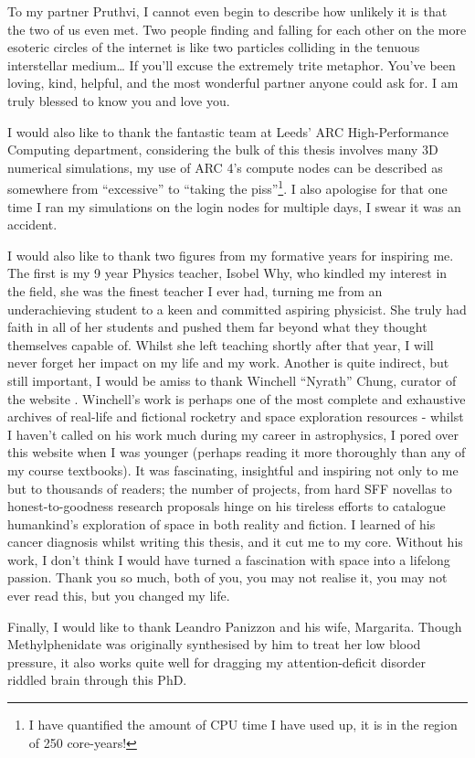 \begin{acknowledgements}
To my partner Pruthvi, I cannot even begin to describe how unlikely it is that the two of us even met.
Two people finding and falling for each other on the more esoteric circles of the internet is like two particles colliding in the tenuous interstellar medium\ldots{}
If you'll excuse the extremely trite metaphor.
You've been loving, kind, helpful, and the most wonderful partner anyone could ask for.
I am truly blessed to know you and love you.

I would also like to thank the fantastic team at Leeds' ARC High-Performance Computing department, considering the bulk of this thesis involves many 3D numerical simulations, my use of ARC 4's compute nodes can be described as somewhere from ``excessive'' to ``taking the piss''\footnote{I have quantified the amount of CPU time I have used up, it is in the region of 250 core-years!}.
I also apologise for that one time I ran my simulations on the login nodes for multiple days, I swear it was an accident.

I would also like to thank two figures from my formative years for inspiring me.
The first is my 9 year Physics teacher, Isobel Why, who kindled my interest in the field, she was the finest teacher I ever had, turning me from an underachieving student to a keen and committed aspiring physicist.
She truly had faith in all of her students and pushed them far beyond what they thought themselves capable of.
Whilst she left teaching shortly after that year, I will never forget her impact on my life and my work.
Another is quite indirect, but still important, I would be amiss to thank Winchell ``Nyrath'' Chung, curator of the website .
Winchell's work is perhaps one of the most complete and exhaustive archives of real-life and fictional rocketry and space exploration resources - whilst I haven't called on his work much during my career in astrophysics, I pored over this website when I was younger (perhaps reading it more thoroughly than any of my course textbooks).
It was fascinating, insightful and inspiring not only to me but to thousands of readers; the number of projects, from hard SFF novellas to honest-to-goodness research proposals hinge on his tireless efforts to catalogue humankind's exploration of space in both reality and fiction.
I learned of his cancer diagnosis whilst writing this thesis, and it cut me to my core.
Without his work, I don't think I would have turned a fascination with space into a lifelong passion.
Thank you so much, both of you, you may not realise it, you may not ever read this, but you changed my life.

Finally, I would like to thank Leandro Panizzon and his wife, Margarita.
Though Methylphenidate was originally synthesised by him to treat her low blood pressure, it also works quite well for dragging my attention-deficit disorder riddled brain through this PhD.

\end{acknowledgements}


